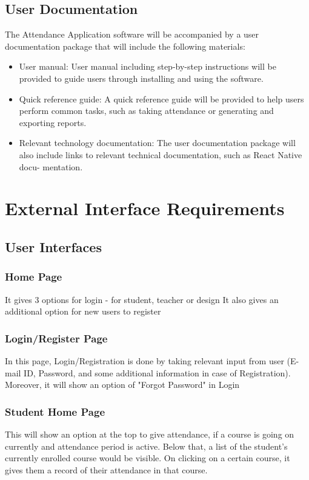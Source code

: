 \documentclass{scrreprt}
\begin{document}
\section{User Documentation}
The Attendance Application software will be accompanied by a user documentation package that will include the following materials:
\begin{itemize}
\item User manual: User manual including step-by-step instructions will be provided to guide users through
installing and using the software.
\item Quick reference guide: A quick reference guide will be provided to help users
perform common tasks, such as taking attendance or generating and exporting reports.
\item Relevant technology documentation: The user documentation package will also
include links to relevant technical documentation, such as React Native docu-
mentation.
\end{itemize}


\chapter{External Interface Requirements}

\section{User Interfaces}
\subsection{Home Page} 
It gives 3 options for login - for student, teacher or design
It also gives an additional option for new users to register 

\subsection{Login/Register Page}
In this page, Login/Registration is done by taking relevant input from user (E-mail ID, Password, and some additional information in case of Registration). 
Moreover, it will show an option of "Forgot Password" in Login 

\subsection{Student Home Page}
This will show an option at the top to give attendance, if a course is going on currently and attendance period is active. 
 Below that, a list of the student's currently enrolled course would be visible. 
On clicking on a certain course, it gives them a record of their attendance in that course. 
\end{document}

